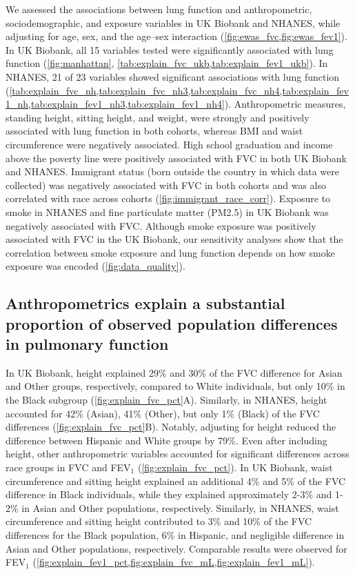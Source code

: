 \documentclass[10pt]{extarticle}
\begin{document}
We assessed the associations between lung function and anthropometric, sociodemographic, and exposure variables in UK Biobank and NHANES, while adjusting for age, sex, and the age--sex interaction (\cref{fig:ewas_fvc,fig:ewas_fev1}). In UK Biobank, all 15 variables tested were significantly associated with lung function (\cref{fig:manhattan}, \cref{tab:explain_fvc_ukb,tab:explain_fev1_ukb}). In NHANES, 21 of 23 variables showed significant associations with lung function (\cref{tab:explain_fvc_nh,tab:explain_fvc_nh3,tab:explain_fvc_nh4,tab:explain_fev1_nh,tab:explain_fev1_nh3,tab:explain_fev1_nh4}). Anthropometric measures, standing height, sitting height, and weight, were strongly and positively associated with lung function in both cohorts, whereas BMI and waist circumference were negatively associated. High school graduation and income above the poverty line were positively associated with FVC in both UK Biobank and NHANES. Immigrant status (born outside the country in which data were collected) was negatively associated with FVC in both cohorts and was also correlated with race across cohorts (\cref{fig:immigrant_race_corr}). Exposure to smoke in NHANES and fine particulate matter (PM2.5) in UK Biobank was negatively associated with FVC. Although smoke exposure was positively associated with FVC in the UK Biobank, our sensitivity analyses show that the correlation between smoke exposure and lung function depends on how smoke exposure was encoded (\cref{fig:data_quality}).

\subsection{Anthropometrics explain a substantial proportion of observed population differences in pulmonary function}\label{ARC_NatureHealth_v2:anthropometrics-explain-a-substantial-proportion-of-observed-population-differences-in-pulmonary-function}

In UK Biobank, height explained 29\% and 30\% of the FVC difference for Asian and Other groups, respectively, compared to White individuals, but only 10\% in the Black subgroup (\cref{fig:explain_fvc_pct}A). Similarly, in NHANES, height accounted for 42\% (Asian), 41\% (Other), but only 1\% (Black) of the FVC differences (\cref{fig:explain_fvc_pct}B). Notably, adjusting for height reduced the difference between Hispanic and White groups by 79\%.
Even after including height, other anthropometric variables accounted for significant differences across race groups in FVC and FEV$_{1}$ (\cref{fig:explain_fvc_pct}). In UK Biobank, waist circumference and sitting height explained an additional 4\% and 5\% of the FVC difference in Black individuals, while they explained approximately 2-3\% and 1-2\% in Asian and Other populations, respectively. Similarly, in NHANES, waist circumference and sitting height contributed to 3\% and 10\% of the FVC differences for the Black population, 6\% in Hispanic, and negligible difference in Asian and Other populations, respectively. Comparable results were observed for FEV$_{1}$ (\cref{fig:explain_fev1_pct,fig:explain_fvc_mL,fig:explain_fev1_mL}).
\end{document}
